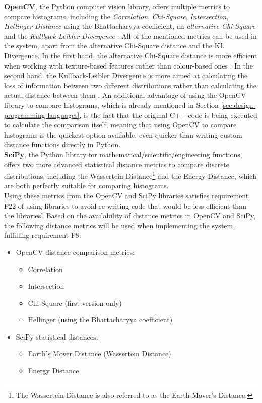 \textbf{OpenCV}, the Python computer vision library, offers multiple metrics to compare histograms, including the \textit{Correlation}, \textit{Chi-Square}, \textit{Intersection}, \textit{Hellinger Distance} using the Bhattacharyya coefficient, an \textit{alternative Chi-Square} and the \textit{Kullback-Leibler Divergence} \cite{opencv-histcomp}. All of the mentioned metrics can be used in the system, apart from the alternative Chi-Square distance and the KL Divergence. In the first hand, the alternative Chi-Square distance is more efficient when working with texture-based features rather than colour-based ones \cite{puzicha1997non}. In the second hand, the Kullback-Leibler Divergence is more aimed at calculating the loss of information between two different distributions rather than calculating the actual distance between them \cite{kurt2007kldivergence}. An additional advantage of using the OpenCV library to compare histograms, which is already mentioned in Section \ref{sec:design-programming-languages}, is the fact that the original C++ code is being executed to calculate the comparison itself, meaning that using OpenCV to compare histograms is the quickest option available, even quicker than writing custom distance functions directly in Python.\\

\textbf{SciPy}, the Python library for mathematical/scientific/engineering functions, offers two more advanced statistical distance metrics to compare discrete distributions, including the Wassertein Distance\footnote{The Wassertein Distance is also referred to as the Earth Mover’s Distance.} and the Energy Distance, which are both perfectly suitable for comparing histograms.\\

Using these metrics from the OpenCV and SciPy libraries satisfies requirement F22 of using libraries to avoid re-writing code that would be less efficient than the libraries'. Based on the availability of distance metrics in OpenCV and SciPy, the following distance metrics will be used when implementing the system, fulfilling requirement F8:

\begin{itemize}
    \item OpenCV distance comparison metrics:
    \begin{itemize}
        \item Correlation
        \item Intersection
        \item Chi-Square (first version only)
        \item Hellinger (using the Bhattacharyya coefficient)
    \end{itemize}
    \item SciPy statistical distances:
    \begin{itemize}
        \item Earth's Mover Distance (Wassertein Distance)
        \item Energy Distance
    \end{itemize}
   
\end{itemize}

